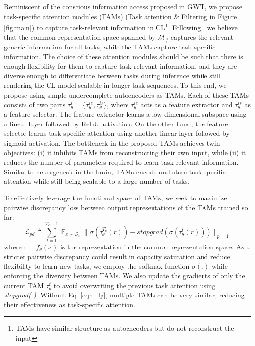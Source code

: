 \documentclass{article} %
\begin{document}
Reminiscent of the conscious information access proposed in GWT, we propose task-specific attention modules (TAMs)  (Task attention \& Filtering in Figure \ref{fig:main}) to capture task-relevant information in CL\footnote{TAMs have similar structure as autoencoders but do not reconstruct the input}.  Following \citet{stephenson2020geometry}, we believe that the common representation space spanned by $\mathcal{M}_f$ captures the relevant generic information for all tasks, while the TAMs capture task-specific information. The choice of these attention modules should be such that there is enough flexibility for them to capture task-relevant information, and they are diverse enough to differentiate between tasks during inference while still rendering the CL model scalable in longer task sequences. To this end, we propose using simple undercomplete autoencoders as TAMs. Each of these TAMs consists of two parts $\tau^{i}_\theta = \{\tau^{ie}_\theta, \tau^{is}_\theta\}$, where $\tau^{ie}_\theta$ acts as a feature extractor and $\tau^{is}_\theta$ as a feature selector. The feature extractor learns a low-dimensional subspace using a linear layer followed by ReLU activation. On the other hand, the feature selector learns task-specific attention using another linear layer followed by sigmoid activation. The bottleneck in the proposed TAMs achieves twin objectives: (i) it inhibits TAMs from reconstructing their own input, while (ii) it reduces the number of parameters required to learn task-relevant information. Similar to neurogenesis in the brain, TAMs encode and store task-specific attention while still being scalable to a large number of tasks. 

To effectively leverage the functional space of TAMs, we seek to maximize pairwise discrepancy loss between output representations of the TAMs trained so far:
\begin{equation}
\label{eqn_lp}
    \mathcal{L}_{pd} \triangleq
    \sum_{t=1}^{T_{c}-1}
    \displaystyle \mathop{\mathbb{E}}_{ x \sim D_{t}} \lVert \sigma(\tau^{T_c}_{\theta}(r)) - stopgrad(\sigma(\tau^t_{\theta}(r))) \rVert_{p=1}
\end{equation}
where $r = f_\theta(x)$ is the representation in the common representation space. As a stricter pairwise discrepancy could result in capacity saturation and reduce flexibility to learn new tasks, we employ the softmax function $\sigma(.)$ while enforcing the diversity between TAMs. We also update the gradients of only the current TAM $\tau^{t}_{\theta}$ to avoid overwriting the previous task attention using \textit{stopgrad(.)}. Without Eq. \ref{eqn_lp}, multiple TAMs can be very similar, reducing their effectiveness as task-specific attention. 
\end{document}

